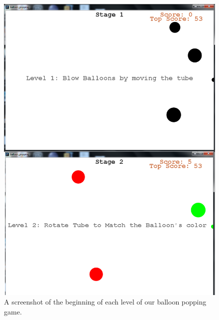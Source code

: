 \begin{figure}
  \centering
  \includegraphics[width=0.70\linewidth]{./figs/tubemaster.png}
  \caption{A screenshot of the beginning of each level of our balloon popping game.}
  \label{fig:shooting-game}
\end{figure}

